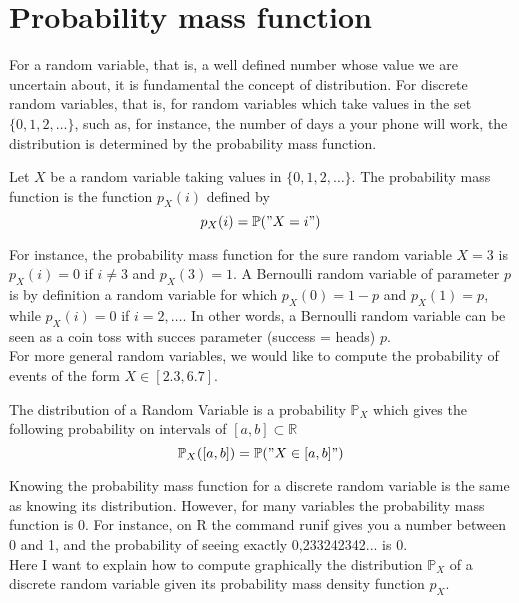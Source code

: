 \section{ Probability mass function}
For a random variable, that is, a well defined number whose value we are uncertain about, it is fundamental the concept of distribution. For discrete random variables, that is, for random variables which take values in the set $\{0,1,2,\ldots\}$, such as, for instance, the number of days a your phone will work, the distribution is determined by the probability mass function. 
\begin{definition}
Let $X$ be a random variable taking values in $\{0,1,2,\ldots\}$. The probability mass function is the function $p_X(i)$ defined by 
\begin{equation}
\label{d:probabilitymass}
p_X(i) = \mathbb P("X = i")
\end{equation}
\end{definition}
For instance, the probability mass function for the sure random variable $X = 3 $ is $p_X(i) = 0 $ if $i \neq 3$ and $p_X(3) = 1$. A Bernoulli random variable of parameter $p$ is by definition a random variable for which $p_X(0) = 1-p$ and $p_X(1) = p $, while $p_X(i) = 0 $ if $i = 2,\ldots$. In other words, a Bernoulli random variable can be seen as a coin toss with succes parameter (success = heads) $p$. \\
For more general random variables, we would like to compute the probability of events of the form $X \in [2.3,6.7]$. 
\begin{definition}[Distribution]
The distribution of a Random Variable is a probability $\mathbb P_X $ which gives the following probability on intervals of $[a,b] \subset \mathbb R $
\begin{equation}
\label{d:distribution}
\mathbb P_X ([a,b]) = \mathbb P("X \in [a,b]")
\end{equation}
\end{definition}
Knowing the probability mass function for a discrete random variable is the same as knowing its distribution. However, for many variables the probability mass function is 0. For instance, on R the command runif gives you a number between 0 and 1, and the probability of seeing exactly 0,233242342... is 0. \\
Here I want to explain how to compute graphically the distribution $\mathbb P_X$ of a discrete random variable given its probability mass density function $p_X$. \\
